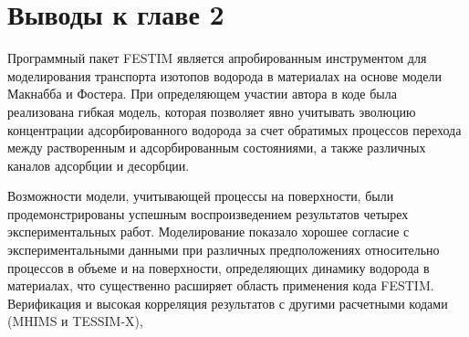 \section{Выводы к главе 2}

Программный пакет FESTIM является апробированным инструментом для моделирования транспорта изотопов водорода в материалах на основе модели Макнабба и Фостера. При определяющем участии автора в коде была реализована гибкая модель, которая позволяет явно учитывать эволюцию концентрации адсорбированного водорода за счет обратимых процессов перехода между растворенным и адсорбированным состояниями, а также различных каналов адсорбции и десорбции.

Возможности модели, учитывающей процессы на поверхности, были продемонстрированы успешным воспроизведением результатов четырех экспериментальных работ. Моделирование показало хорошее согласие с экспериментальными данными при различных предположениях относительно процессов в объеме и на поверхности, определяющих динамику водорода в материалах, что существенно расширяет область применения кода FESTIM. Верификация и высокая корреляция результатов с другими расчетными кодами (MHIMS и TESSIM-X), 


\FloatBarrier
